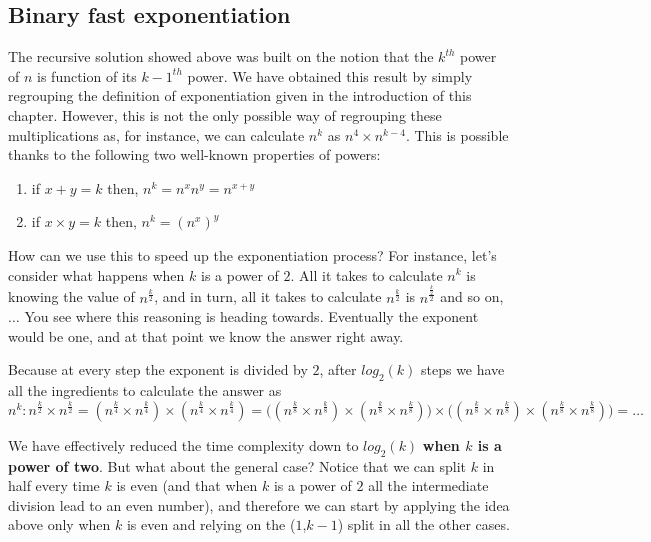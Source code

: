 \subsection{Binary fast exponentiation}
\label{exponentiation:sec:fast_exponentiation}
The recursive solution showed above was built on the notion that the ${k^{th}}$ power of $n$ is function of its ${k-1^{th}}$ power. We have obtained this result by simply regrouping the definition of exponentiation given in the introduction of this chapter. However, this is not the only possible way of regrouping these multiplications as, for instance, we can calculate $n^k$ as $n^{4} \times n^{k-4}$.
This is possible thanks to the following two well-known properties of powers:

\begin{enumerate}
    \item if $x+y=k$ then, $n^k = n^x  n^y = n^{x+y}$ 
    \item if $x \times y=k$ then, $n^k = (n^x)^y$
\end{enumerate}

How can we use this to speed up the exponentiation process? For instance, let's consider what happens when  $k$ is a power of $2$.
All it takes to calculate $n^k$ is knowing the value of $n^{\frac{k}{2}}$, and in turn, all it takes to calculate $n^{\frac{k}{2}}$ is $n^{\frac{\frac{k}{2}}{2}}$ and so on, $\ldots$ You see where this reasoning is heading towards.
Eventually the exponent would be one, and at that point we know the answer right away.

Because at every step the exponent is divided by $2$, after $log_2(k)$ steps we have all the ingredients to calculate the answer as $n^k : n^{\frac{k}{2}} \times n^{\frac{k}{2}} = (n^{\frac{k}{4}} \times n^{\frac{k}{4}}) \times (n^{\frac{k}{4}} \times n^{\frac{k}{4}}) = \big ( (n^{\frac{k}{8}} \times n^{\frac{k}{8}}) \times (n^{\frac{k}{8}} \times n^{\frac{k}{8}}) \big ) \times \big ( (n^{\frac{k}{8}} \times n^{\frac{k}{8}}) \times (n^{\frac{k}{8}} \times n^{\frac{k}{8}}) \big )  = \ldots$


We have effectively reduced the time complexity down to $log_2(k)$ \textbf{when $k$ is a power of two}.
But what about the general case? Notice that we can split $k$ in half every time $k$ is even (and that when $k$ is a power of $2$ all the intermediate division lead to an even number), and therefore we can start by applying the idea above only when $k$ is even and relying on the ($1$,$k-1$) split in all the other cases. 



